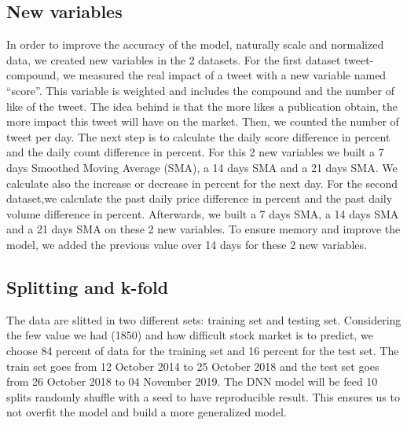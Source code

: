 \documentclass[conference]{IEEEtran}
\begin{document}
\subsection{New variables}\label{AA}
In order to improve the accuracy of the model, naturally scale and normalized data, we created new variables in the 2 datasets.\newline
\newline
For the first dataset tweet-compound, we measured the real impact of a tweet with a new variable named “score”. This variable is weighted and includes the compound and the number of like of the tweet. The idea behind is that the more likes a publication obtain, the more impact this tweet will have on the market. Then, we counted the number of tweet per day. The next step is to calculate the daily score difference in percent and the daily count difference in percent. For this 2 new variables we built a 7 days Smoothed Moving Average (SMA), a 14 days SMA and a 21 days SMA. We calculate also the increase or decrease in percent for the next day. \newline
\newline
For the second dataset,we calculate the past daily price difference in percent and the past daily volume difference in percent. Afterwards, we built a 7 days SMA, a 14 days SMA and a 21 days SMA on these 2 new variables.  
To ensure memory and improve the model, we added the previous value over 14 days for these 2 new variables.

\subsection{Splitting and k-fold}\label{AA}
The data are slitted in two different sets: training set and testing set. Considering the few value we had (1850) and how difficult stock market is to predict, we choose 84 percent of data for the training set and 16 percent for the test set. The train set goes from 12 October 2014 to 25 October 2018 and the test set goes from 26 October 2018 to 04 November 2019.\newline
\newline
The DNN model will be feed 10 splits randomly shuffle with a seed to have reproducible result. This ensures us to not overfit the model and build a more generalized model. 
\end{document}
